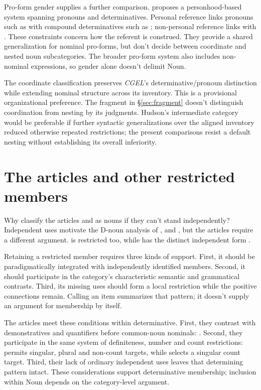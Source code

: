 \documentclass[12pt]{article}
\begin{document}
Pro-form gender supplies a further comparison. \textcite{reynolds2025proformgender} proposes a personhood-based system spanning pronouns and determinatives. Personal reference links pronouns such as  with compound determinatives such as ; non-personal reference links  with . These constraints concern how the referent is construed. They provide a shared generalization for nominal pro-forms, but don't decide between coordinate and nested noun subcategories. The broader pro-form system also includes non-nominal expressions, so gender alone doesn't delimit Noun.

The coordinate classification preserves \textit{CGEL}'s determinative/pronoun distinction while extending nominal structure across its inventory. This is a provisional organizational preference. The fragment in §\ref{sec:fragment} doesn't distinguish coordination from nesting by its judgments. Hudson's intermediate category would be preferable if further syntactic generalizations over the aligned inventory reduced otherwise repeated restrictions; the present comparisons resist a default nesting without establishing its overall inferiority.

\section{The articles and other restricted members}\label{sec:articles}

Why classify the articles  and  as nouns if they can't stand independently? Independent uses motivate the D-noun analysis of ,  and , but the articles require a different argument.  is restricted too, while  has the distinct independent form  \citep[371--372, 410--411]{huddleston2002}.

Retaining a restricted member requires three kinds of support. First, it should be paradigmatically integrated with independently identified members. Second, it should participate in the category's characteristic semantic and grammatical contrasts. Third, its missing uses should form a local restriction while the positive connections remain. Calling an item  summarizes that pattern; it doesn't supply an argument for membership by itself.

The articles meet these conditions within determinative. First, they contrast with demonstratives and quantifiers before common-noun nominals: . Second, they participate in the same system of definiteness, number and count restrictions:  permits singular, plural and non-count targets, while  selects a singular count target. Third, their lack of ordinary independent uses leaves that determining pattern intact. These considerations support determinative membership; inclusion within Noun depends on the category-level argument.
\end{document}
